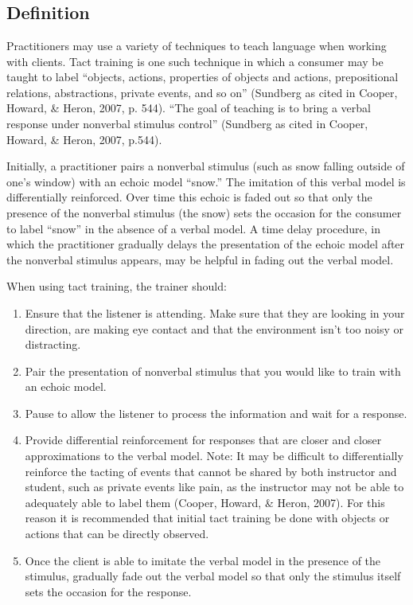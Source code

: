 \clearpage \section{\fourdTwelve{}}
\subsection{Definition}
Practitioners may use a variety of techniques to teach language when working with clients.  Tact training is one such technique in which a consumer may be taught to label ``objects, actions, properties of objects and actions, prepositional relations, abstractions, private events, and so on''  (Sundberg as cited in Cooper, Howard, \& Heron, 2007, p. 544). ``The goal of teaching is to bring a verbal response under nonverbal stimulus control''  (Sundberg as cited in Cooper, Howard, \& Heron, 2007, p.544). 

Initially, a practitioner pairs a nonverbal stimulus (such as snow falling outside of one's window) with an echoic model ``snow.''  The imitation of this verbal model is differentially reinforced.  Over time this echoic is faded out so that only the presence of the nonverbal stimulus (the snow) sets the occasion for the consumer to label ``snow'' in the absence of a verbal model. A time delay procedure, in which the practitioner gradually delays the presentation of the echoic model after the nonverbal stimulus appears, may be helpful in fading out the verbal model.  

When using tact training, the trainer should:
\begin{enumerate}
\item Ensure that the listener is attending.  Make sure that they are looking in your direction, are making eye contact and that the environment isn't too noisy or distracting.
\item Pair the presentation of nonverbal stimulus that you would like to train with an echoic model.  
\item Pause to allow the listener to process the information and wait for a response.
\item Provide differential reinforcement for responses that are closer and closer approximations to the verbal model. Note:  It may be difficult to differentially reinforce the tacting of events that cannot be shared by both instructor and student, such as private events like pain, as the instructor may not be able to adequately able to label them (Cooper, Howard, \& Heron, 2007).  For this reason it is recommended that initial tact training be done with objects or actions that can be directly observed.
\item Once the client is able to imitate the verbal model in the presence of the stimulus, gradually fade out the verbal model so that only the stimulus itself sets the occasion for the response. 
\end{enumerate}
%
